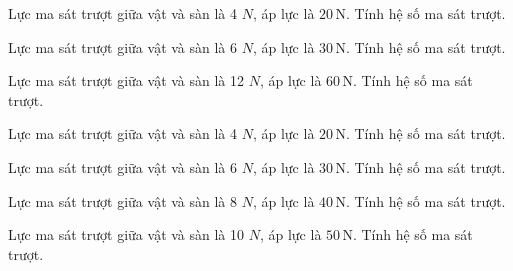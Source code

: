 \begin{ex}
Lực ma sát trượt giữa vật và sàn là 4 $N$, áp lực là $20\,\text{N}$. Tính hệ số ma sát trượt.
\end{ex}

\begin{ex}
Lực ma sát trượt giữa vật và sàn là 6 $N$, áp lực là $30\,\text{N}$. Tính hệ số ma sát trượt.
\end{ex}

\begin{bt}
Lực ma sát trượt giữa vật và sàn là 12 $N$, áp lực là $60\,\text{N}$. Tính hệ số ma sát trượt.
\end{bt}

\begin{bt}
Lực ma sát trượt giữa vật và sàn là 4 $N$, áp lực là $20\,\text{N}$. Tính hệ số ma sát trượt.
\end{bt}

\begin{bt}
Lực ma sát trượt giữa vật và sàn là 6 $N$, áp lực là $30\,\text{N}$. Tính hệ số ma sát trượt.
\end{bt}

\begin{bt}
Lực ma sát trượt giữa vật và sàn là 8 $N$, áp lực là $40\,\text{N}$. Tính hệ số ma sát trượt.
\end{bt}

\begin{bt}
Lực ma sát trượt giữa vật và sàn là 10 $N$, áp lực là $50\,\text{N}$. Tính hệ số ma sát trượt.
\end{bt}

